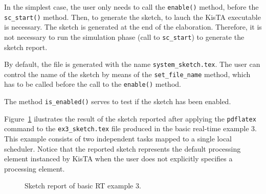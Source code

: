 In the simplest case, the user only needs to call the \texttt{enable()} method, before the \texttt{sc\_start()} method.
Then, to generate the sketch, to lauch the KisTA executable is necessary.
The sketch is generated at the end of the elaboration.
Therefore, it is not necessary to run the simulation phase (call to \texttt{sc\_start}) to generate the sketch report.

By default, the file is generated with the name \texttt{system\_sketch.tex}.
The user can control the name of the sketch by means of the \texttt{set\_file\_name} method,
which has to be called before the call to the \texttt{enable()} method.

The method \texttt{is\_enabled()} serves to test if the sketch has been enabled.

Figure~\ref{fig:ex3_sketch} ilustrates the result of the sketch reported
after applying the \texttt{pdflatex} command to the \texttt{ex3\_sketch.tex} file
produced in the basic real-time example 3.
This example consists of two independent tasks mapped to a single local scheduler.
Notice that the reported sketch represents the default processing element
instanced by KisTA when the user does not explicitly specifies a processing element.
%

\begin{figure}[h]
\centering
\caption{Sketch report of basic RT example 3.} 
\label{fig:ex3_sketch}
\end{figure}

